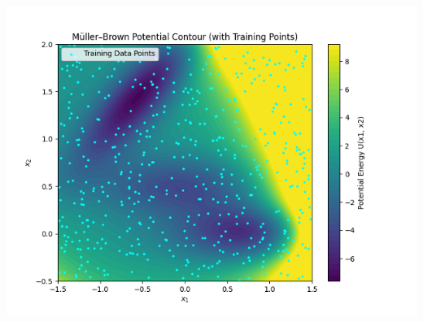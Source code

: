 \documentclass[11pt]{article}
\begin{document}
\begin{minipage}[t]{0.48\textwidth}
    \vspace{-\baselineskip}
    \centering
    \includegraphics[width=\linewidth]{potential_data.png}
    \label{fig:surface}
\end{minipage}
\end{document}
